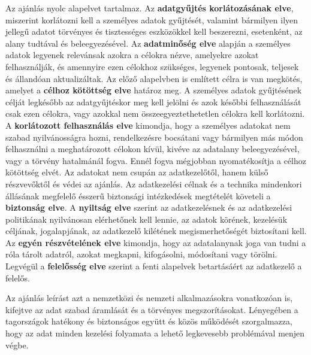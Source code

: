 Az ajánlás nyolc alapelvet tartalmaz. Az \textbf{adatgyűjtés korlátozásának elve}, miszerint korlátozni kell a személyes adatok gyűjtését, valamint bármilyen ilyen jellegű adatot törvényes és tisztességes eszközökkel kell beszerezni, esetenként, az alany tudtával és beleegyezésével. Az \textbf{adatminőség elve} alapján a személyes adatok legyenek relevánsak azokra a célokra nézve, amelyekre azokat felhasználják, és amennyire ezen célokhoz szükséges, legyenek pontosak, teljesek és állandóan aktualizáltak. Az előző alapelvben is említett célra is van megkötés, amelyet a \textbf{célhoz kötöttség elve} határoz meg. A személyes adatok gyűjtésének célját legkésőbb az adatgyűjtéskor meg kell jelölni és azok későbbi felhasználását csak ezen célokra, vagy azokkal nem összeegyeztethetetlen célokra kell korlátozni. A \textbf{korlátozott felhasználás elve} kimondja, hogy a személyes adatokat nem szabad nyilvánosságra hozni, rendelkezésre bocsátani vagy bármilyen más módon felhasználni a meghatározott célokon kívül, kivéve az adatalany beleegyezésével, vagy a törvény hatalmánál fogva. Ennél fogva mégjobban nyomatékosítja a célhoz kötöttség elvét. Az adatokat nem csupán az adatkezelőtől, hanem külső részvevőktől és védei az ajánlás. Az adatkezelési célnak és a technika mindenkori állásának megfelelő ésszerű biztonsági intézkedések megtételét követeli a \textbf{biztonság elve}. A \textbf{nyiltság elve} szerint az adatkezelésnek és az adatkezelési politikának nyilvánosan elérhetőnek kell lennie, az adatok körének, kezelésük céljának, jogalapjának, az adatkezelő kilétének megismerhetőségét biztosítani kell. Az \textbf{egyén részvételének elve} kimondja, hogy az adatalanynak joga van tudni a róla tárolt adatról, azokat megkapni, kifogásolni, módosítani vagy törölni. Legvégül a \textbf{felelősség elve} szerint a fenti alapelvek betartásáért az adatkezelő a felelős.

Az ajánlás leírást azt a nemzetközi és nemzeti alkalmazásokra vonatkozóan is, kifejtve az adat szabad áramlását és a törvényes megszorításokat. Lényegében a tagországok hatékony és biztonságos együtt és közös működését szorgalmazza, hogy az adat minden kezelési folyamata a lehető legkevesebb problémával menjen végbe. \cite{OECD}
